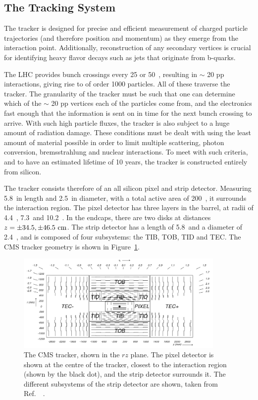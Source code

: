 \subsection{The Tracking System}
The tracker is designed for precise and efficient measurement of charged particle trajectories (and therefore position and momentum) as they emerge from the interaction point.
Additionally, reconstruction of any secondary vertices is crucial for identifying heavy flavor decays such as jets that originate from b-quarks.

The \ac{LHC} provides bunch crossings every 25 or 50~\ns, resulting in $\sim$ 20 pp interactions, giving rise to of order 1000 particles. 
All of these traverse the tracker. 
The granularity of the tracker must be such that one can determine which of the $\sim$ 20 pp vertices each of the particles come from, 
and the electronics fast enough that the information is sent on in time for the next bunch crossing to arrive.
With such high particle fluxes, the tracker is also subject to a huge amount of radiation damage.
These conditions must be dealt with using the least amount of material possible in order to limit multiple scattering, photon conversion, bremsstrahlung and nuclear interactions.
To meet with such criteria, and to have an estimated lifetime of 10 years, the tracker is constructed entirely from silicon.

The tracker consists therefore of an all silicon pixel and strip detector.
Measuring 5.8~\m in length and 2.5~\m in diameter, with a total active area of 200~\msq, it surrounds the interaction region.
The pixel detector has three layers in the barrel, at radii of 4.4~\cm, 7.3~\cm and 10.2~\cm. In the endcaps, there are two disks at distances $z=\pm 34.5, \pm 46.5~\mathrm{cm}$.
The strip detector has a length of 5.8~\m and a diameter of 2.4~\m, and is composed of four subsystems: the \ac{TIB}, \ac{TOB}, \ac{TID} and \ac{TEC}. The \ac{CMS} tracker geometry is shown in Figure~\ref{fig:CMStracker}.

\begin{figure}[htbp]
  \begin{center}
  \includegraphics[width=0.9\textwidth]{Figures/detector/fig_cmstracker}
  \caption{The \ac{CMS} tracker, shown in the $rz$ plane. The pixel detector is shown at the centre of the tracker, closest to the interaction region (shown by the black dot), and the strip detector surrounds it. The different subsystems of the strip detector are shown, taken from Ref.~~\cite{Chatrchyan:2008aa}.
}
  \label{fig:CMStracker}
  \end{center}
\end{figure}

